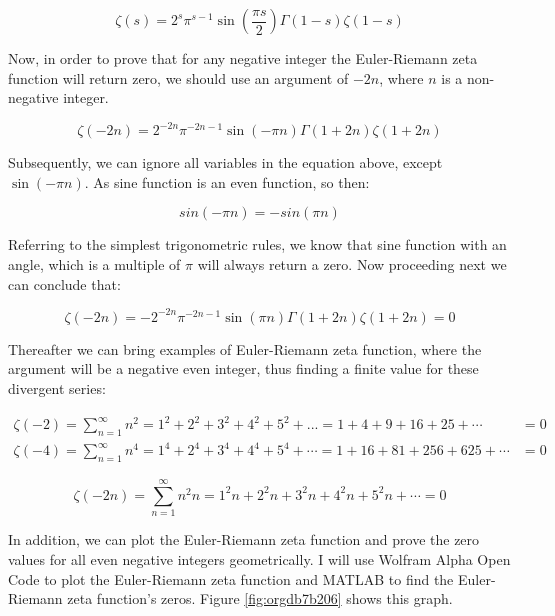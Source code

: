 \documentclass[a4paper]{article}
\begin{document}
\begin{equation}
  \zeta(s)=2^s\pi^{s-1}\sin(\frac{\pi s}{2})\Gamma(1-s)\zeta(1-s)
  \end{equation}

Now, in order to prove that for any negative integer the Euler-Riemann zeta
function will return zero, we should use an argument of \(-2n\), where \(n\) is a
non-negative integer. 

\begin{equation}
  \zeta(-2n)=2^{-2n}\pi^{-2n-1}\sin(-\pi n)\Gamma(1+2n)\zeta(1+2n)
  \end{equation}

Subsequently, we can ignore all variables in the equation above, except
\(\sin(-\pi n)\). As sine function is an even function, so then:

\begin{equation}
  sin(-\pi n)=-sin(\pi n)
  \end{equation}

Referring to the simplest trigonometric rules, we know that sine function with
an angle, which is a multiple of \(\pi\) will always return a zero. Now proceeding
next we can conclude that: 

\begin{equation*}
  \zeta(-2n)=-2^{-2n}\pi^{-2n-1}\sin(\pi n)\Gamma(1+2n)\zeta(1+2n)=0
  \end{equation*}

Thereafter we can bring examples of Euler-Riemann zeta function, where the
argument will be a negative even integer, thus finding a finite value for these
divergent series: 

\begin{align*}
  \zeta(-2)=\sum_{n=1}^{\infty} n^2=1^2+2^2+3^2+4^2+5^2+...=1+4+9+16+25+\cdots&=0\\
  \zeta(-4)=\sum_{n=1}^{\infty} n^4=1^4+2^4+3^4+4^4+5^4+\cdots=1+16+81+256+625+\cdots&=0
\end{align*}

\begin{equation}
\zeta(-2n)=\sum_{n=1}^{\infty} n^2n=1^2n+2^2n+3^2n+4^2n+5^2n+\cdots=0
  \end{equation}

In addition, we can plot the Euler-Riemann zeta function and prove the zero
values for all even negative integers geometrically. I will use Wolfram Alpha
Open Code to plot the Euler-Riemann zeta function and MATLAB to find the
Euler-Riemann zeta function's zeros. Figure \ref{fig:orgdb7b206} shows this graph. 
\end{document}

